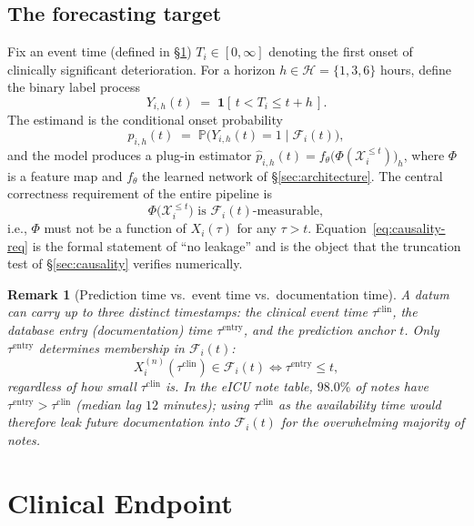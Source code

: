 \documentclass[11pt]{article}
\newtheorem{remark}{Remark}[section]
\newcommand{\Prb}{\mathbb{P}}
\newcommand{\F}{\mathcal{F}}
\newcommand{\X}{\mathcal{X}}
\newcommand{\1}[1]{\mathbf{1}\!\left[#1\right]}
\begin{document}
\subsection{The forecasting target}

Fix an event time (defined in \S\ref{sec:endpoint}) $T_i \in [0,\infty]$ denoting the first onset of clinically significant deterioration. For a horizon $h\in\mathcal{H}=\{1,3,6\}$ hours, define the binary label process
\begin{equation}
Y_{i,h}(t) \;=\; \1{\,t < T_i \le t+h\,}.
\end{equation}
The estimand is the conditional onset probability
\begin{equation}
p_{i,h}(t) \;=\; \Prb\big(Y_{i,h}(t)=1 \mid \F_i(t)\big),
\end{equation}
and the model produces a plug-in estimator $\hat p_{i,h}(t) = f_\theta\big(\Phi(\X_i^{\le t})\big)_h$, where $\Phi$ is a feature map and $f_\theta$ the learned network of \S\ref{sec:architecture}. The central correctness requirement of the entire pipeline is
\begin{equation}
\Phi\big(\X_i^{\le t}\big) \text{ is } \F_i(t)\text{-measurable}, \label{eq:causality-req}
\end{equation}
i.e., $\Phi$ must not be a function of $X_i(\tau)$ for any $\tau > t$. Equation~\eqref{eq:causality-req} is the formal statement of ``no leakage'' and is the object that the truncation test of \S\ref{sec:causality} verifies numerically.

\begin{remark}[Prediction time vs.\ event time vs.\ documentation time]
A datum can carry up to three distinct timestamps: the clinical event time $\tau^{\text{clin}}$, the database entry (documentation) time $\tau^{\text{entry}}$, and the prediction anchor $t$. Only $\tau^{\text{entry}}$ determines membership in $\F_i(t)$:
\[
X_i^{(n)}(\tau^{\text{clin}}) \in \F_i(t) \iff \tau^{\text{entry}} \le t,
\]
regardless of how small $\tau^{\text{clin}}$ is. In the eICU note table, $98.0\%$ of notes have $\tau^{\text{entry}} > \tau^{\text{clin}}$ (median lag $12$ minutes); using $\tau^{\text{clin}}$ as the availability time would therefore leak future documentation into $\F_i(t)$ for the overwhelming majority of notes.
\end{remark}

\section{Clinical Endpoint}\label{sec:endpoint}
\end{document}
